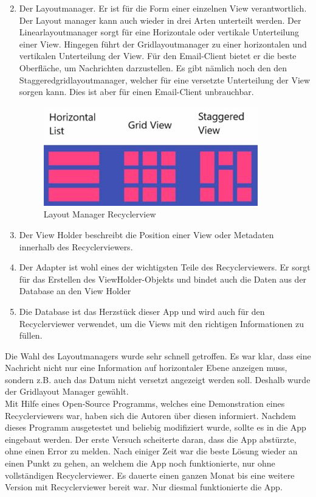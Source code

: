 \documentclass[a4paper,11pt]{article}
\begin{document}
\begin{enumerate}

    \setcounter{enumi}{1}
    \item Der Layoutmanager. Er ist für die Form einer einzelnen View verantwortlich. 
Der Layout manager kann auch wieder in drei Arten unterteilt werden. Der Linearlayoutmanager sorgt für eine 
Horizontale oder vertikale Unterteilung einer View. Hingegen führt der Gridlayoutmanager zu einer horizontalen 
und vertikalen Unterteilung der View. Für den Email-Client bietet er die  
beste Oberfläche, um Nachrichten darzustellen. Es gibt nämlich noch den den Staggeredgridlayoutmanager, welcher 
für eine versetzte Unterteilung der View sorgen kann. Dies ist aber für einen Email-Client unbrauchbar. 

\begin{figure}[H]
    \centering
    \includegraphics[width=.4\textwidth]{media/RecyclerviewLayoutManagerCropt.jpeg}
    \caption{Layout Manager Recyclerview \cite{LayoutManagerPicture}}
\end{figure}

    \item Der View Holder beschreibt die Position einer View oder Metadaten innerhalb des Recyclerviewers.

    \item Der Adapter ist wohl eines der wichtigsten Teile des Recyclerviewers. Er sorgt für das Erstellen des ViewHolder-Objekts und
bindet auch die Daten aus der Database an den View Holder

    \item Die Database ist das Herzstück dieser App und wird auch für den Recyclerviewer verwendet, um die 
Views mit den richtigen Informationen zu füllen. 

\end{enumerate}

Die Wahl des Layoutmanagers wurde sehr schnell getroffen. Es war klar, dass eine Nachricht nicht nur eine Information auf horizontaler Ebene anzeigen muss, sondern
z.B. auch das Datum nicht versetzt angezeigt werden soll. Deshalb wurde der Gridlayout Manager gewählt. \\

Mit Hilfe eines Open-Source Programms, welches eine Demonstration eines Recyclerviewers war, haben sich die Autoren über diesen informiert. \cite{RecViewApp}
Nachdem dieses Programm ausgetestet und beliebig modifiziert wurde, sollte es in die App eingebaut werden. 
Der erste Versuch scheiterte daran,
dass die App abstürzte, ohne einen Error zu melden. Nach einiger Zeit war die beste Lösung wieder an einen Punkt zu gehen, an welchem die App noch funktionierte, nur ohne vollständigen 
Recyclerviewer. Es dauerte einen ganzen Monat bis eine weitere Version mit Recyclerviewer bereit war. Nur diesmal funktionierte die App. \\
\end{document}
